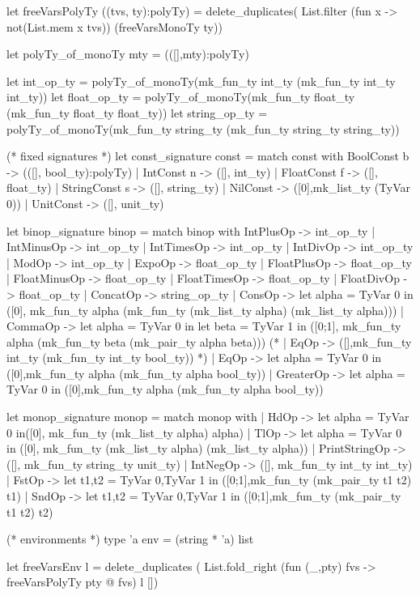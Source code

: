 let freeVarsPolyTy ((tvs, ty):polyTy) = delete_duplicates(
    List.filter (fun x -> not(List.mem x tvs)) (freeVarsMonoTy ty))

let polyTy_of_monoTy mty = (([],mty):polyTy)

let int_op_ty = polyTy_of_monoTy(mk_fun_ty int_ty (mk_fun_ty int_ty int_ty))
let float_op_ty =
    polyTy_of_monoTy(mk_fun_ty float_ty (mk_fun_ty float_ty float_ty))
let string_op_ty =
    polyTy_of_monoTy(mk_fun_ty string_ty (mk_fun_ty string_ty string_ty))

(* fixed signatures *)
let const_signature const = match const with
   BoolConst b -> (([], bool_ty):polyTy)
 | IntConst n -> ([], int_ty)
 | FloatConst f -> ([], float_ty)
 | StringConst s -> ([], string_ty)
 | NilConst -> ([0],mk_list_ty (TyVar 0))
 | UnitConst -> ([], unit_ty)

let binop_signature binop = match binop with
     IntPlusOp   -> int_op_ty
   | IntMinusOp   -> int_op_ty
   | IntTimesOp   -> int_op_ty
   | IntDivOp   -> int_op_ty
   | ModOp      -> int_op_ty
   | ExpoOp     -> float_op_ty
   | FloatPlusOp   -> float_op_ty
   | FloatMinusOp   -> float_op_ty
   | FloatTimesOp   -> float_op_ty
   | FloatDivOp   -> float_op_ty
   | ConcatOp -> string_op_ty
   | ConsOp -> 
       let alpha = TyVar 0
       in ([0], 
              mk_fun_ty alpha (mk_fun_ty (mk_list_ty alpha) (mk_list_ty alpha)))
   | CommaOp ->
       let alpha = TyVar 0 in
       let beta = TyVar 1 in
           ([0;1],
            mk_fun_ty alpha (mk_fun_ty beta (mk_pair_ty alpha beta)))
(*   | EqOp -> ([],mk_fun_ty int_ty (mk_fun_ty int_ty bool_ty)) *)
   | EqOp ->
     let alpha = TyVar 0 in ([0],mk_fun_ty alpha (mk_fun_ty alpha bool_ty))
   | GreaterOp ->
     let alpha = TyVar 0 in ([0],mk_fun_ty alpha (mk_fun_ty alpha bool_ty))

let monop_signature monop = match monop with
    | HdOp -> let alpha = TyVar 0 in([0], mk_fun_ty (mk_list_ty alpha) alpha)
    | TlOp -> let alpha = TyVar 0 in
                  ([0], mk_fun_ty (mk_list_ty alpha) (mk_list_ty alpha))
    | PrintStringOp -> ([], mk_fun_ty string_ty unit_ty)
    | IntNegOp -> ([], mk_fun_ty int_ty int_ty)
    | FstOp -> let t1,t2 = TyVar 0,TyVar 1
             in ([0;1],mk_fun_ty (mk_pair_ty t1 t2) t1)
    | SndOp -> let t1,t2 = TyVar 0,TyVar 1
             in ([0;1],mk_fun_ty (mk_pair_ty t1 t2) t2)

(* environments *)
type 'a env = (string * 'a) list

let freeVarsEnv l = delete_duplicates (
    List.fold_right (fun (_,pty) fvs -> freeVarsPolyTy pty @ fvs) l [])

